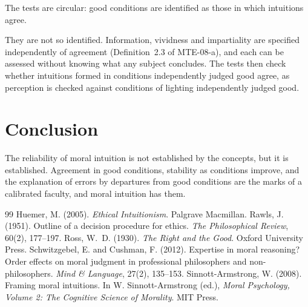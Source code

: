 \documentclass{situationist-preprint}
\begin{document}
\begin{objection}
The tests are circular: good conditions are identified as those in which intuitions agree.
\end{objection}

\begin{reply}
They are not so identified. Information, vividness and impartiality are specified independently of agreement (Definition~2.3 of MTE-08-a), and each can be assessed without knowing what any subject concludes. The tests then check whether intuitions formed in conditions independently judged good agree, as perception is checked against conditions of lighting independently judged good.
\end{reply}

\section{Conclusion}

The reliability of moral intuition is not established by the concepts, but it is established. Agreement in good conditions, stability as conditions improve, and the explanation of errors by departures from good conditions are the marks of a calibrated faculty, and moral intuition has them.

\begin{thebibliography}{99}\small
{} Huemer, M. (2005). \emph{Ethical Intuitionism}. Palgrave Macmillan.
 Rawls, J. (1951). Outline of a decision procedure for ethics. \emph{The Philosophical Review}, 60(2), 177--197.
 Ross, W.~D. (1930). \emph{The Right and the Good}. Oxford University Press.
 Schwitzgebel, E. and Cushman, F. (2012). Expertise in moral reasoning? Order effects on moral judgment in professional philosophers and non-philosophers. \emph{Mind \& Language}, 27(2), 135--153.
 Sinnott-Armstrong, W. (2008). Framing moral intuitions. In W. Sinnott-Armstrong (ed.), \emph{Moral Psychology, Volume 2: The Cognitive Science of Morality}. MIT Press.
\end{thebibliography}
\end{document}
